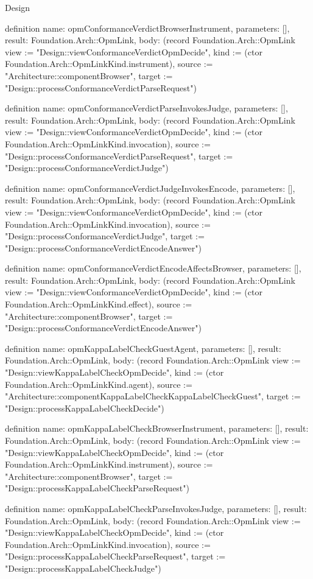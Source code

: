 \begin{lexlean}{Design}
\begin{semanticmodule}
definition{
  name: opmConformanceVerdictBrowserInstrument,
  parameters: [],
  result: Foundation.Arch::OpmLink,
  body: (record Foundation.Arch::OpmLink {view := "Design::viewConformanceVerdictOpmDecide", kind := (ctor Foundation.Arch::OpmLinkKind.instrument), source := "Architecture::componentBrowser", target := "Design::processConformanceVerdictParseRequest"})
}

definition{
  name: opmConformanceVerdictParseInvokesJudge,
  parameters: [],
  result: Foundation.Arch::OpmLink,
  body: (record Foundation.Arch::OpmLink {view := "Design::viewConformanceVerdictOpmDecide", kind := (ctor Foundation.Arch::OpmLinkKind.invocation), source := "Design::processConformanceVerdictParseRequest", target := "Design::processConformanceVerdictJudge"})
}

definition{
  name: opmConformanceVerdictJudgeInvokesEncode,
  parameters: [],
  result: Foundation.Arch::OpmLink,
  body: (record Foundation.Arch::OpmLink {view := "Design::viewConformanceVerdictOpmDecide", kind := (ctor Foundation.Arch::OpmLinkKind.invocation), source := "Design::processConformanceVerdictJudge", target := "Design::processConformanceVerdictEncodeAnswer"})
}

definition{
  name: opmConformanceVerdictEncodeAffectsBrowser,
  parameters: [],
  result: Foundation.Arch::OpmLink,
  body: (record Foundation.Arch::OpmLink {view := "Design::viewConformanceVerdictOpmDecide", kind := (ctor Foundation.Arch::OpmLinkKind.effect), source := "Architecture::componentBrowser", target := "Design::processConformanceVerdictEncodeAnswer"})
}

definition{
  name: opmKappaLabelCheckGuestAgent,
  parameters: [],
  result: Foundation.Arch::OpmLink,
  body: (record Foundation.Arch::OpmLink {view := "Design::viewKappaLabelCheckOpmDecide", kind := (ctor Foundation.Arch::OpmLinkKind.agent), source := "Architecture::componentKappaLabelCheckKappaLabelCheckGuest", target := "Design::processKappaLabelCheckDecide"})
}

definition{
  name: opmKappaLabelCheckBrowserInstrument,
  parameters: [],
  result: Foundation.Arch::OpmLink,
  body: (record Foundation.Arch::OpmLink {view := "Design::viewKappaLabelCheckOpmDecide", kind := (ctor Foundation.Arch::OpmLinkKind.instrument), source := "Architecture::componentBrowser", target := "Design::processKappaLabelCheckParseRequest"})
}

definition{
  name: opmKappaLabelCheckParseInvokesJudge,
  parameters: [],
  result: Foundation.Arch::OpmLink,
  body: (record Foundation.Arch::OpmLink {view := "Design::viewKappaLabelCheckOpmDecide", kind := (ctor Foundation.Arch::OpmLinkKind.invocation), source := "Design::processKappaLabelCheckParseRequest", target := "Design::processKappaLabelCheckJudge"})
}


\end{semanticmodule}
\end{lexlean}
